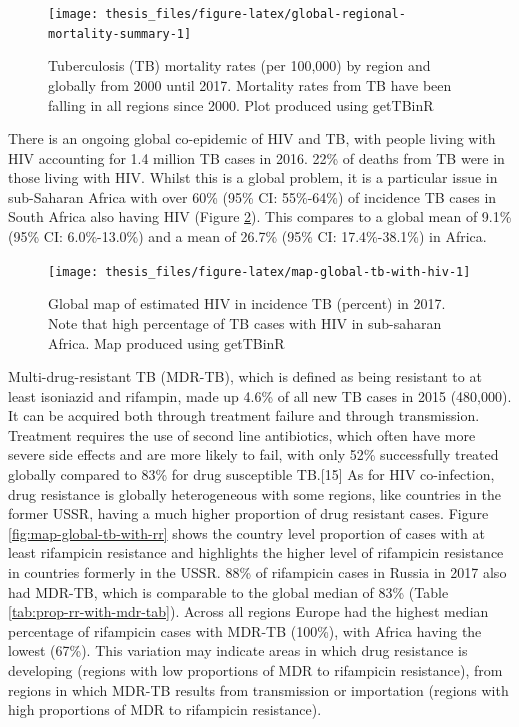\documentclass[11pt,twoside]{bristolthesis}
\begin{document}
  \begin{figure}
  
  {\centering \texttt{[image: thesis\_files/figure-latex/global-regional-mortality-summary-1]} 
  
  }
  
  \caption{Tuberculosis (TB) mortality rates (per 100,000) by region and globally from 2000 until 2017. Mortality rates from TB have been falling in all regions since 2000. Plot produced using getTBinR}\label{fig:global-regional-mortality-summary}
  \end{figure}
  There is an ongoing global co-epidemic of HIV and TB, with people living with HIV accounting for 1.4 million TB cases in 2016. 22\% of deaths from TB were in those living with HIV. Whilst this is a global problem, it is a particular issue in sub-Saharan Africa with over 60\% (95\% CI: 55\%-64\%) of incidence TB cases in South Africa also having HIV (Figure \ref{fig:map-global-tb-with-hiv}). This compares to a global mean of 9.1\% (95\% CI: 6.0\%-13.0\%) and a mean of 26.7\% (95\% CI: 17.4\%-38.1\%) in Africa.
  \begin{figure}
  
  {\centering \texttt{[image: thesis\_files/figure-latex/map-global-tb-with-hiv-1]} 
  
  }
  
  \caption{Global map of estimated HIV in incidence TB (percent) in 2017. Note that high percentage of TB cases with HIV in sub-saharan Africa. Map produced using getTBinR}\label{fig:map-global-tb-with-hiv}
  \end{figure}
  Multi-drug-resistant TB (MDR-TB), which is defined as being resistant to at least isoniazid and rifampin, made up 4.6\% of all new TB cases in 2015 (480,000). It can be acquired both through treatment failure and through transmission. Treatment requires the use of second line antibiotics, which often have more severe side effects and are more likely to fail, with only 52\% successfully treated globally compared to 83\% for drug susceptible TB.{[}15{]} As for HIV co-infection, drug resistance is globally heterogeneous with some regions, like countries in the former USSR, having a much higher proportion of drug resistant cases. Figure \ref{fig:map-global-tb-with-rr} shows the country level proportion of cases with at least rifampicin resistance and highlights the higher level of rifampicin resistance in countries formerly in the USSR. 88\% of rifampicin cases in Russia in 2017 also had MDR-TB, which is comparable to the global median of 83\% (Table \ref{tab:prop-rr-with-mdr-tab}). Across all regions Europe had the highest median percentage of rifampicin cases with MDR-TB (100\%), with Africa having the lowest (67\%). This variation may indicate areas in which drug resistance is developing (regions with low proportions of MDR to rifampicin resistance), from regions in which MDR-TB results from transmission or importation (regions with high proportions of MDR to rifampicin resistance).
\end{document}
